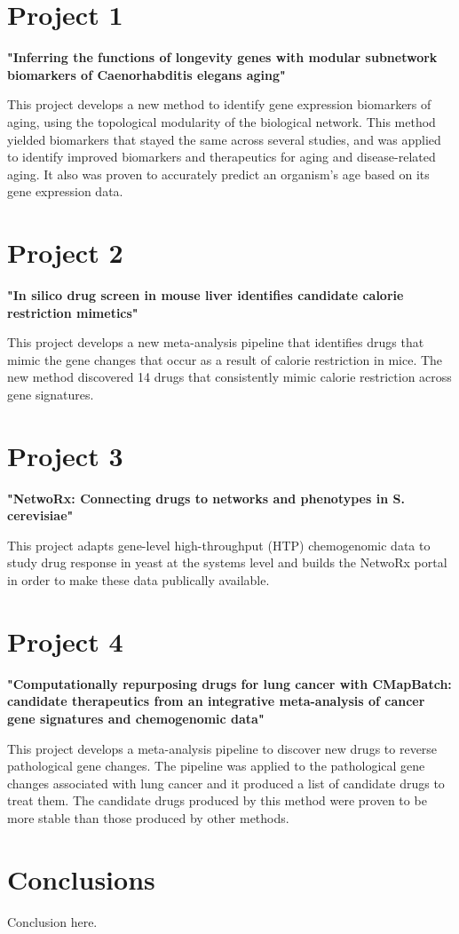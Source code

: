 \documentclass{sig-alternate-05-2015}
\begin{document}
\section{Project 1}
\textbf{"Inferring the functions of longevity genes with modular subnetwork biomarkers of Caenorhabditis elegans aging"}
\vspace{5mm}

This project develops a new method to identify gene expression biomarkers of
aging, using the topological modularity of the biological network. This method
yielded biomarkers that stayed the same across several studies, and was applied
to identify improved biomarkers and therapeutics for aging and disease-related
aging. It also was proven to accurately predict an organism's age based on its
gene expression data.

\section{Project 2}
\textbf{"In silico drug screen in mouse liver identifies candidate calorie restriction mimetics"}
\vspace{5mm}

This project develops a new meta-analysis pipeline that identifies drugs that
mimic the gene changes that occur as a result of calorie restriction in mice.
The new method discovered 14 drugs that consistently mimic calorie restriction
across gene signatures.

\section{Project 3}
\textbf{"NetwoRx: Connecting drugs to networks and phenotypes in S. cerevisiae"}
\vspace{5mm}

This project adapts gene-level high-throughput (HTP) chemogenomic data to study
drug response in yeast at the systems level and builds the NetwoRx portal in
order to make these data publically available.

\section{Project 4}
\textbf{"Computationally repurposing drugs for lung cancer with CMapBatch: candidate therapeutics from an integrative meta-analysis of cancer gene signatures and chemogenomic data"}
\vspace{5mm}

This project develops a meta-analysis pipeline to discover new drugs to reverse
pathological gene changes. The pipeline was applied to the pathological gene
changes associated with lung cancer and it produced a list of candidate drugs
to treat them. The candidate drugs produced by this method were proven to be
more stable than those produced by other methods.

\section{Conclusions}
Conclusion here.
\end{document}
